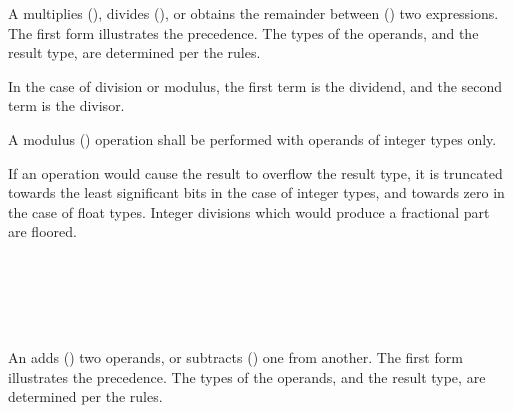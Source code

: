 
\begin{grammar}
 \\
	 \\
	 \terminal{*}  \\
	 \terminal{/}  \\
	 \terminal{\%}  \\
\end{grammar}

\specsubsubitem
A  multiplies (\terminal{*}), divides
(\terminal{/}), or obtains the remainder between (\terminal{\%}) two
expressions. The first form illustrates the precedence. The types of the
operands, and the result type, are determined per the 
rules.

\specsubsubitem
In the case of division or modulus, the first term is the dividend, and the
second term is the divisor.

\specsubsubitem
A modulus (\terminal{\%}) operation shall be performed with operands of integer
types only.

\specsubsubitem
If an operation would cause the result to overflow the result type, it is
truncated towards the least significant bits in the case of integer types, and
towards zero in the case of float types. Integer divisions which would produce
a fractional part are floored.


\begin{grammar}
 \\
	 \\
	 \terminal{+}  \\
	 \terminal{-}  \\
\end{grammar}

\specsubsubitem
An  adds (\terminal{+}) two operands, or
subtracts (\terminal{-}) one from another. The first form illustrates the
precedence. The types of the operands, and the result type, are determined per
the  rules.

